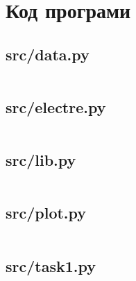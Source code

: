 \section{Код програми}
\label{sec:code}

\subsection{src/data.py}
\label{subsec:src/data.py}
\inputminted{python}{../src/data.py}

\subsection{src/electre.py}
\label{subsec:src/electre.py}
\inputminted{python}{../src/electre.py}

\subsection{src/lib.py}
\label{subsec:src/lib.py}
\inputminted{python}{../src/lib.py}

\subsection{src/plot.py}
\label{subsec:src/plot.py}
\inputminted{python}{../src/plot.py}

\subsection{src/task1.py}
\label{subsec:src/task1.py}
\inputminted{python}{../src/task1.py}
